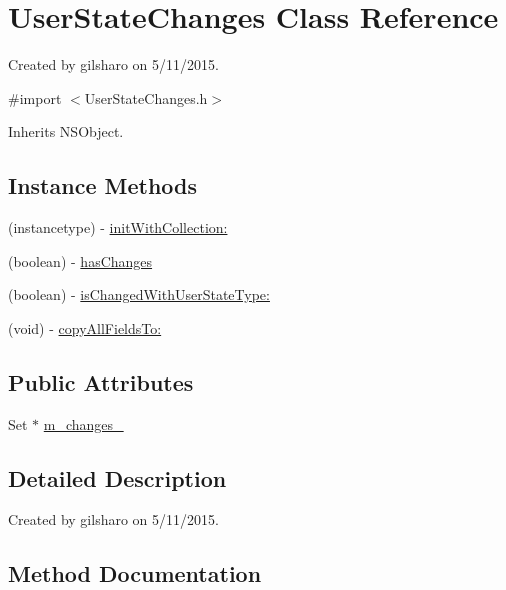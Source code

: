 \hypertarget{interface_user_state_changes}{}\section{User\+State\+Changes Class Reference}
\label{interface_user_state_changes}


Created by gilsharo on 5/11/2015.  




{\ttfamily \#import $<$User\+State\+Changes.\+h$>$}



Inherits N\+S\+Object.

\subsection*{Instance Methods}
\begin{DoxyCompactItemize}
\item 
(instancetype) -\/ \hyperlink{interface_user_state_changes_a48c380497a6ce18a63bc440eab91595c}{init\+With\+Collection\+:}
\item 
(boolean) -\/ \hyperlink{interface_user_state_changes_adbccc5a2a684afe2dcf0ff4a6e22950c}{has\+Changes}
\item 
(boolean) -\/ \hyperlink{interface_user_state_changes_a9d2b0113e4a7a48e356f4a01526eacc8}{is\+Changed\+With\+User\+State\+Type\+:}
\item 
(void) -\/ \hyperlink{interface_user_state_changes_a1570b14a0a19fcbf31e806ffede0d2a7}{copy\+All\+Fields\+To\+:}
\end{DoxyCompactItemize}
\subsection*{Public Attributes}
\begin{DoxyCompactItemize}
\item 
Set $\ast$ \hyperlink{interface_user_state_changes_ab848fb92b5c1da84f1f903ba4f65381e}{m\+\_\+changes\+\_\+}
\end{DoxyCompactItemize}


\subsection{Detailed Description}
Created by gilsharo on 5/11/2015. 

\subsection{Method Documentation}
\hypertarget{interface_user_state_changes_a1570b14a0a19fcbf31e806ffede0d2a7}{}
